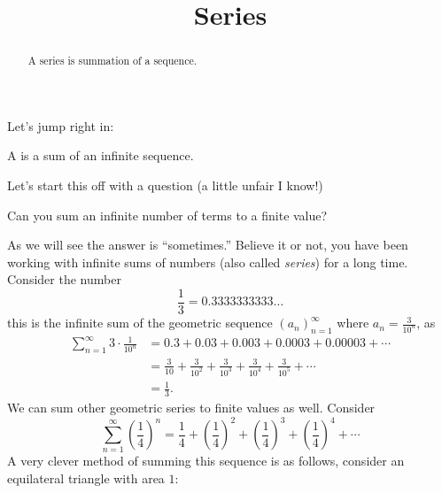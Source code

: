 \documentclass{ximera}
\title[Dig-In:]{Series}
\begin{document}
\begin{abstract}
A series is summation of a sequence.
\end{abstract}
\maketitle


Let's jump right in:


\begin{definition}
  A  is a sum of an infinite sequence.
\end{definition}


Let's start this off with a question (a little unfair I know!)

\begin{question}
  Can you sum an infinite number of terms to a finite value?
  \begin{prompt}
    \begin{multipleChoice}
    \end{multipleChoice}
  \end{prompt}
\end{question}
As we will see the answer is ``sometimes.''  Believe it or not, you
have been working with infinite sums of numbers (also called
\textit{series}) for a long time. Consider the number
\[
\frac{1}{3} = 0.3333333333\dots
\]
this is the infinite sum of the geometric sequence
$(a_n)_{n=1}^\infty$ where $a_n = \frac{3}{10^{n}}$, as
\begin{align*}
  \sum_{n=1}^\infty 3\cdot \frac{1}{10^{n}} &= 0.3 + 0.03+0.003+ 0.0003+ 0.00003+ \cdots\\
  &= \frac{3}{10} + \frac{3}{10^2} + \frac{3}{10^3} + \frac{3}{10^4} + \frac{3}{10^5} + \cdots\\
  &=\frac{1}{3}.
\end{align*}
We can sum other geometric series to finite values as well. Consider
\[
\sum_{n=1}^\infty \left(\frac{1}{4}\right)^n =
\frac{1}{4} + \left(\frac{1}{4}\right)^2 + \left(\frac{1}{4}\right)^3 + \left(\frac{1}{4}\right)^4 + \cdots 
\]
A very clever method of summing this sequence is as follows, consider
an equilateral triangle with area $1$:
\begin{image}[1in]
\end{image}
\end{document}
